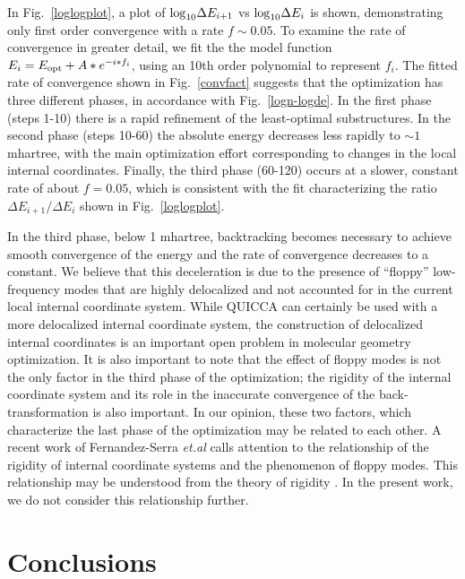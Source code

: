 \documentclass[prl,aps,preprint,superbib,12pt]{revtex4}
\begin{document}
In Fig.~\ref{loglogplot}, a plot of ${\rm log}_{10}{\Delta E_{i+1}}$ vs ${\rm log }_{10} {\Delta E_{i}}$ 
is shown, demonstrating only first order convergence with a rate $f \sim 0.05$.   To examine the rate of convergence
in greater detail, we fit the the model function $E_{i}=E_{\rm opt}+A*e^{-i * f_i}$, using  
an 10th order polynomial to represent $f_i$.  The fitted rate of convergence shown in Fig.~\ref{convfact}
suggests that the optimization has three different phases, in accordance with Fig.~\ref{logn-logde}.
In the first phase (steps 1-10) there is a rapid refinement of the least-optimal substructures. In the 
second phase (steps 10-60) the absolute energy decreases less rapidly to $\sim 1$ mhartree, with the  
main optimization effort corresponding to changes in the local internal coordinates. Finally, the third phase 
(60-120) occurs at a slower, constant rate of about $f=0.05$, which is consistent with the fit characterizing 
the ratio ${\Delta E_{i+1}}/{\Delta E_{i}}$ shown in Fig.~\ref{loglogplot}.

In the third phase, below 1 mhartree, backtracking becomes necessary to achieve smooth 
convergence of the energy and the rate of convergence decreases to a constant.  We believe
that this deceleration is due to the presence of ``floppy'' low-frequency modes
that are highly delocalized and not accounted for in the current local internal 
coordinate system.  While QUICCA can certainly be used with a more delocalized 
internal coordinate system, the construction of delocalized internal coordinates 
is an important open problem in molecular geometry optimization.   It is also important to note that 
the effect of floppy modes is not the only factor in the third phase of the optimization; the rigidity 
of the internal coordinate system and its role in the inaccurate convergence of the back-transformation 
is also important. In our opinion, these two factors, which characterize the last phase of the 
optimization may be related to each other.  A recent work of Fernandez-Serra {\it et.al} \cite{MFernandez-Serra03} 
calls attention to the relationship of the rigidity of internal coordinate systems and the 
phenomenon of floppy modes. This relationship may be understood from the theory of 
rigidity \cite{JPhillips85}. In the present work, we do not 
consider this relationship further.

\section{Conclusions}
\end{document}
